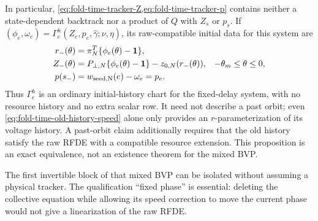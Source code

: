\begin{proposition}
In particular, \cref{eq:fold-time-tracker-Z,eq:fold-time-tracker-p} contains
neither a state-dependent backtrack nor a product of \(Q\) with \(Z_s\) or
\(p_s\).  If
\((\phi_e,\omega_e)=\Gamma_e^h(Z_e,p_e,\widehat\gamma;\nu,\eta)\), its
raw-compatible initial data for this system are
\begin{align}
 r_-(\theta)&=\pi_N^T\{\phi_e(\theta)-\mathbf1\},\notag\\
 Z_-(\theta)&=P_{\perp,N}\{\phi_e(\theta)-\mathbf1\}
                  -z_{0,N}(r_-(\theta)),
 &-\theta_m\le\theta\le0,\notag\\
 p(s_-)&=w_{\rm seed,N}(e)-\omega_e=p_e.          \label{eq:fold-time-collar-interface}
\end{align}
Thus \(\Gamma_e^h\) is an ordinary initial-history chart for the fixed-delay
system, with no resource history and no extra scalar row.  It need not
describe a past orbit; even \cref{eq:fold-time-old-history-speed} alone only
provides an \(r\)-parameterization of its voltage history.  A past-orbit
claim additionally requires that the old history satisfy the raw RFDE with
a compatible resource extension.  This proposition is an exact equivalence,
not an existence theorem for the mixed BVP.
\end{proposition}

The first invertible block of that mixed BVP can be isolated without
assuming a physical tracker.  The qualification ``fixed phase'' is
essential: deleting the collective equation while allowing its speed
correction to move the current phase would not give a linearization of the
raw RFDE.

